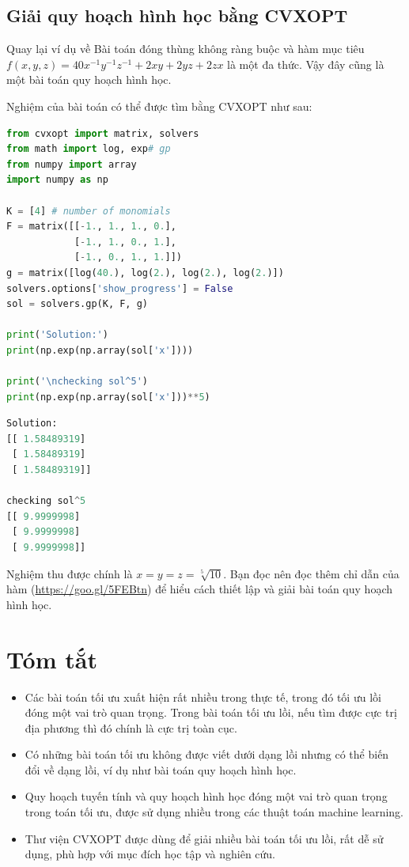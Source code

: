  
\subsection{Giải quy hoạch hình học bằng CVXOPT}
Quay lại ví dụ về Bài toán đóng thùng {không ràng buộc} và hàm mục
tiêu $f(x, y, z) = 40x^{-1}y^{-1}z^{-1} + 2xy + 2yz + 2zx$ là một đa thức. 
Vậy đây cũng là một bài toán quy hoạch hình học. 
 
Nghiệm của bài toán có thể được tìm bằng CVXOPT như sau:
\begin{lstlisting}[language=Python]
from cvxopt import matrix, solvers 
from math import log, exp# gp 
from numpy import array 
import numpy as np 
 
K = [4] # number of monomials
F = matrix([[-1., 1., 1., 0.], 
            [-1., 1., 0., 1.], 
            [-1., 0., 1., 1.]]) 
g = matrix([log(40.), log(2.), log(2.), log(2.)]) 
solvers.options['show_progress'] = False 
sol = solvers.gp(K, F, g) 
 
print('Solution:') 
print(np.exp(np.array(sol['x']))) 
 
print('\nchecking sol^5') 
print(np.exp(np.array(sol['x']))**5) 
\end{lstlisting}
\kq 
\begin{lstlisting}[language=Python]
Solution: 
[[ 1.58489319] 
 [ 1.58489319] 
 [ 1.58489319]] 
 
checking sol^5 
[[ 9.9999998] 
 [ 9.9999998] 
 [ 9.9999998]] 
\end{lstlisting}
 
Nghiệm thu được chính là $x = y = z = \sqrt[5]{10}$. Bạn đọc nên
đọc thêm chỉ dẫn của hàm  (\url{https://goo.gl/5FEBtn})
để hiểu cách thiết lập và giải bài toán quy hoạch hình học.
 
 
\section{Tóm tắt}
\begin{itemize}
    \item Các bài toán tối ưu xuất hiện rất nhiều trong thực tế, trong đó tối ưu
    lồi đóng một vai trò quan trọng. Trong bài toán tối ưu lồi, nếu tìm được cực
    trị địa phương thì đó chính là cực trị toàn cục.
     
    \item Có những bài toán tối ưu không được viết dưới dạng lồi nhưng có thể
    biến đổi về dạng lồi, ví dụ như bài toán quy hoạch hình học.
     
    \item Quy hoạch tuyến tính và quy hoạch hình học đóng một vai trò quan
    trọng trong toán tối ưu, được sử dụng nhiều trong các thuật toán machine
    learning.
     
    \item Thư viện CVXOPT được dùng để giải nhiều bài toán tối ưu lồi, rất dễ
    sử dụng, phù hợp với mục đích học tập và nghiên cứu. 
 
\end{itemize}
 
 
